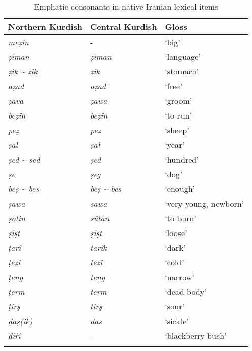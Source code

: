 \documentclass[output=paper]{langsci/langscibook}
\begin{document}
\begin{table}
\begin{tabular}{lll}
\lsptoprule
Northern Kurdish & Central Kurdish & Gloss\\\midrule
\textit{meẓin} & - & ‘big’\\
\textit{ẓiman} & \textit{ẓiman} & ‘language’\\
\textit{ẓik} \textit{{\textasciitilde} zik} & \textit{zik} & ‘stomach’\\
\textit{aẓad}  & \textit{aẓad} & ‘free’\\
\textit{ẓava} & \textit{ẓawa} & ‘groom’\\
\textit{beẓîn} & \textit{beẓîn}  & ‘to run’\\
\textit{peẓ} & \textit{pez} & ‘sheep’\\
\textit{ṣal} & \textit{ṣał} & ‘year’\\
\textit{ṣed} \textit{{\textasciitilde} sed} & \textit{ṣed} & ‘hundred’\\
\textit{ṣe} & \textit{ṣeg} & ‘dog’\\
\textit{beṣ} \textit{{\textasciitilde} bes} & \textit{beṣ} \textit{{\textasciitilde} bes} & ‘enough’\\
\textit{ṣawa} & \textit{sawa} & ‘very young, newborn’\\
\textit{ṣotin} & \textit{sûtan} & ‘to burn’\\
\textit{ṣiṣt} & \textit{ṣiṣt} & ‘loose’\\
\textit{ṭarî} & \textit{tarîk} & ‘dark’\\
\textit{ṭezî} & \textit{tezî} & ‘cold’\\
\textit{ṭeng} & \textit{teng} & ‘narrow’\\
\textit{ṭerm} & \textit{term} & ‘dead body’\\
\textit{ṭirş} & \textit{tirş} & ‘sour’\\
\textit{ḍaṣ(ik)} & \textit{das} & ‘sickle’\\
\textit{ḍiṙî} & - & ‘blackberry bush’\\
\lspbottomrule
\end{tabular}
\caption{Emphatic consonants in native Iranian lexical items}
\label{tab:opengin:7}
\end{table}
\end{document}
